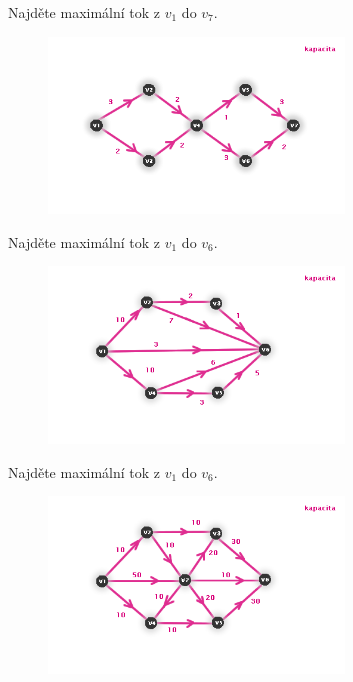 \begin{t_exercise}
  \item Najděte maximální tok z $v_1$ do $v_7$.
  \begin{figure}[!htbp]
    \centering
    \includegraphics[width=0.7\textwidth]{img/net1.png}
  \end{figure}
  
  \item Najděte maximální tok z $v_1$ do $v_6$.
  \begin{figure}[!htbp]
    \centering
    \includegraphics[width=0.7\textwidth]{img/net2.png}
  \end{figure}
  
  \item Najděte maximální tok z $v_1$ do $v_6$.
  \begin{figure}[!htbp]
    \centering
    \includegraphics[width=0.7\textwidth]{img/net3.png}
  \end{figure}
  

\end{t_exercise}
